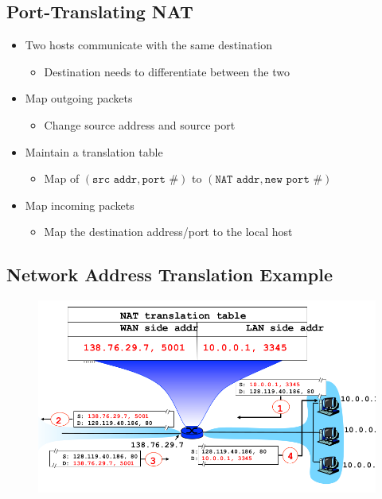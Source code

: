 \subsection{Port-Translating NAT}
\begin{itemize}[nosep]
    \item Two hosts communicate with the same destination
          \begin{itemize}[nosep]
              \item Destination needs to differentiate between the two
          \end{itemize}
    \item Map outgoing packets
          \begin{itemize}[nosep]
              \item Change source address and source port
          \end{itemize}
    \item Maintain a translation table
          \begin{itemize}[nosep]
              \item Map of $(\texttt{src addr}, \texttt{port \#})$ to $(\texttt{NAT addr}, \texttt{new port \#})$
          \end{itemize}
    \item Map incoming packets
          \begin{itemize}[nosep]
              \item Map the destination address/port to the local host
          \end{itemize}
\end{itemize}

\subsection{Network Address Translation Example}
\begin{figure}[H]
    \includegraphics[scale=0.5]{lazy/network-address-translation.png}
\end{figure}

